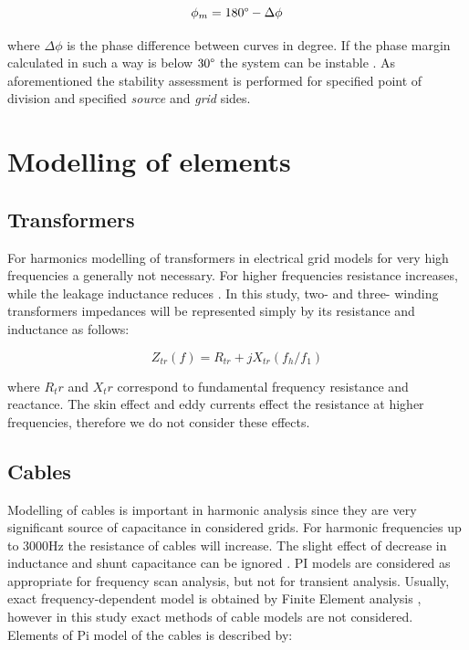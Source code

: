 \documentclass[12pt]{report} %
\begin{document}
\begin{equation}
	\phi_m =180\degree-\Delta \phi
\end{equation}

where $\Delta \phi$ is the phase difference between curves in degree. If the phase margin calculated in such a way is below $30\degree$ the system can be instable \cite{borwin1}. As aforementioned the stability assessment is performed for specified point of division and specified \textit{source} and \textit{grid} sides.

\section{Modelling of elements} \label{sec:modellingofelements}
\subsection{Transformers}
For harmonics modelling of transformers in electrical grid models for very high frequencies a generally not necessary. For higher frequencies resistance increases, while the leakage inductance reduces \cite{das}. In this study, two- and three- winding transformers impedances will be represented simply by its resistance and inductance as follows:

\begin{equation}
	Z_{tr}(f)=R_{tr}+jX_{tr} (f_h/f_1 )
\end{equation}

where $R_tr$ and $X_tr$ correspond to fundamental frequency resistance and reactance. The skin effect and eddy currents effect the resistance at higher frequencies, therefore we do not consider these effects.

\subsection{Cables}
Modelling of cables is important in harmonic analysis since they are very significant source of capacitance in considered grids. For harmonic frequencies up to 3000Hz the resistance of cables will increase. The slight effect of decrease in inductance and shunt capacitance can be ignored \cite{das}. PI models are considered as appropriate for frequency scan analysis, but not for transient analysis.
Usually, exact frequency-dependent model is obtained by Finite Element analysis \cite{das}, however in this study exact methods of cable models are not considered. Elements of Pi model of the cables is described by:
\end{document}
